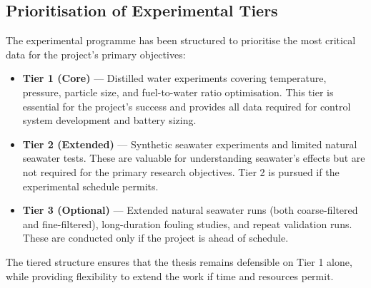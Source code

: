 \documentclass[12pt]{article}
\begin{document}
\subsection*{Prioritisation of Experimental Tiers}

The experimental programme has been structured to prioritise the most critical
data for the project's primary objectives:

\begin{itemize}
    \item \textbf{Tier 1 (Core)} --- Distilled water experiments covering temperature,
    pressure, particle size, and fuel-to-water ratio optimisation. This tier is essential for the project's success and
    provides all data required for control system development and battery sizing.

    \item \textbf{Tier 2 (Extended)} --- Synthetic seawater experiments and limited
    natural seawater tests. These are valuable for understanding seawater's effects
    but are not required for the primary research objectives. Tier 2 is pursued if
    the experimental schedule permits.

    \item \textbf{Tier 3 (Optional)} --- Extended natural seawater runs (both
    coarse-filtered and fine-filtered), long-duration fouling studies, and repeat
    validation runs. These are conducted only if the project is ahead of schedule.
\end{itemize}

The tiered structure ensures that the thesis remains defensible on Tier 1 alone,
while providing flexibility to extend the work if time and resources permit.

\break
\end{document}
